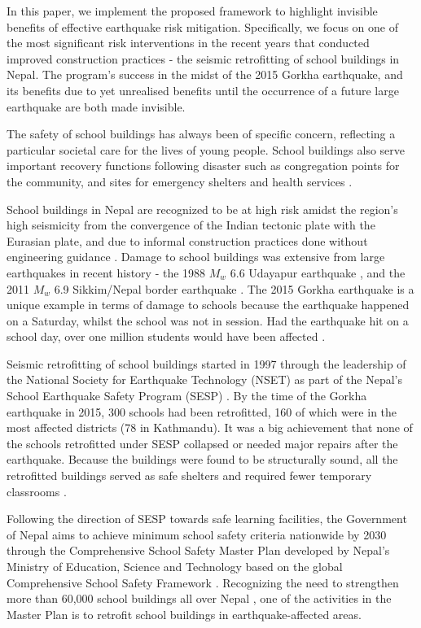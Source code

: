 \documentclass[utf8]{frontiersSCNS} %
\begin{document}
In this paper, we implement the proposed framework to highlight invisible benefits of effective earthquake risk mitigation. Specifically, we focus on one of the most significant risk interventions in the recent years that conducted improved construction practices - the seismic retrofitting of school buildings in Nepal. The program's success in the midst of the 2015 Gorkha earthquake, and its benefits due to yet unrealised benefits until the occurrence of a future large earthquake are both made invisible. 

The safety of school buildings has always been of specific concern, reflecting a particular societal care for the lives of young people. School buildings also serve important recovery functions following disaster such as congregation points for the community, and sites for emergency shelters and health services \citep{dixit2014public}. 

School buildings in Nepal are recognized to be at high risk amidst the region's high seismicity from the convergence of the Indian tectonic plate with the Eurasian plate, and due to informal construction practices done without engineering guidance \citep{marasini2020}. Damage to school buildings was extensive from large earthquakes in recent history - the 1988 $M_{w}$ 6.6 Udayapur earthquake \citep{gupta1988report}, and the 2011 $M_{w}$ 6.9 Sikkim/Nepal border earthquake \citep{rai2012reconnaissance}. The 2015 Gorkha earthquake is a unique example in terms of damage to schools because the earthquake happened on a Saturday, whilst the school was not in session. Had the earthquake hit on a school day, over one million students would have been affected \citep{dixit2014public}.

Seismic retrofitting of school buildings started in 1997 through the leadership of the National Society for Earthquake Technology (NSET) as part of the Nepal's School Earthquake Safety Program (SESP)  \citep{marasini_2019}. By the time of the Gorkha earthquake in 2015, 300 schools had been retrofitted, 160 of which were in the most affected districts (78 in Kathmandu). It was a big achievement that none of the schools retrofitted under SESP collapsed or needed major repairs after the earthquake. Because the buildings were found to be structurally sound, all the retrofitted buildings served as safe shelters and required fewer temporary classrooms \citep{marasini_2019}. 

Following the direction of SESP towards safe learning facilities, the Government of Nepal aims to achieve minimum school safety criteria nationwide by 2030 through the Comprehensive School Safety Master Plan developed by Nepal's Ministry of Education, Science and Technology \citep{cehrdc2018} based on the global Comprehensive School Safety Framework \citep{unisdr2017}. Recognizing the need to strengthen more than 60,000 school buildings all over Nepal \citep{marasini2020}, one of the activities in the Master Plan is to retrofit school buildings in earthquake-affected areas.
\end{document}
